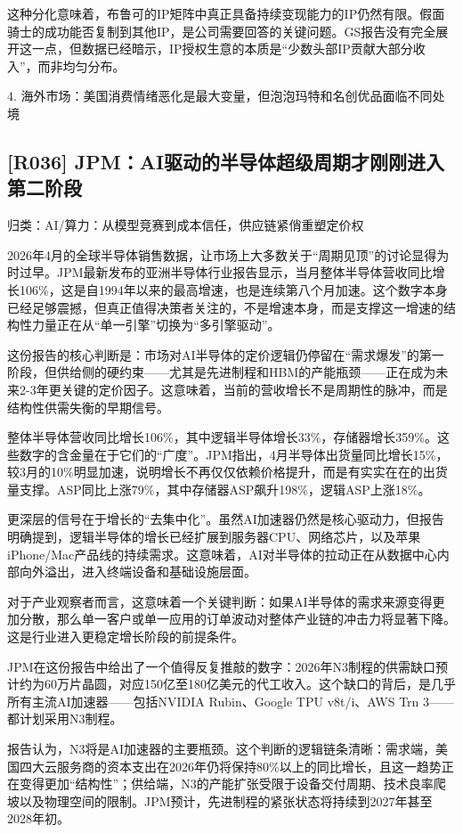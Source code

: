 \documentclass[11pt]{ctexart}
\begin{document}
这种分化意味着，布鲁可的IP矩阵中真正具备持续变现能力的IP仍然有限。假面骑士的成功能否复制到其他IP，是公司需要回答的关键问题。GS报告没有完全展开这一点，但数据已经暗示，IP授权生意的本质是“少数头部IP贡献大部分收入”，而非均匀分布。

4. 海外市场：美国消费情绪恶化是最大变量，但泡泡玛特和名创优品面临不同处境

\subsection{[R036] JPM：AI驱动的半导体超级周期才刚刚进入第二阶段}
{\small\color{refgray}归类：AI/算力：从模型竞赛到成本信任，供应链紧俏重塑定价权}

2026年4月的全球半导体销售数据，让市场上大多数关于“周期见顶”的讨论显得为时过早。JPM最新发布的亚洲半导体行业报告显示，当月整体半导体营收同比增长106\%，这是自1994年以来的最高增速，也是连续第八个月加速。这个数字本身已经足够震撼，但真正值得决策者关注的，不是增速本身，而是支撑这一增速的结构性力量正在从“单一引擎”切换为“多引擎驱动”。

这份报告的核心判断是：市场对AI半导体的定价逻辑仍停留在“需求爆发”的第一阶段，但供给侧的硬约束——尤其是先进制程和HBM的产能瓶颈——正在成为未来2-3年更关键的定价因子。这意味着，当前的营收增长不是周期性的脉冲，而是结构性供需失衡的早期信号。

整体半导体营收同比增长106\%，其中逻辑半导体增长33\%，存储器增长359\%。这些数字的含金量在于它们的“广度”。JPM指出，4月半导体出货量同比增长15\%，较3月的10\%明显加速，说明增长不再仅仅依赖价格提升，而是有实实在在的出货量支撑。ASP同比上涨79\%，其中存储器ASP飙升198\%，逻辑ASP上涨18\%。

更深层的信号在于增长的“去集中化”。虽然AI加速器仍然是核心驱动力，但报告明确提到，逻辑半导体的增长已经扩展到服务器CPU、网络芯片，以及苹果iPhone/Mac产品线的持续需求。这意味着，AI对半导体的拉动正在从数据中心内部向外溢出，进入终端设备和基础设施层面。

对于产业观察者而言，这意味着一个关键判断：如果AI半导体的需求来源变得更加分散，那么单一客户或单一应用的订单波动对整体产业链的冲击力将显著下降。这是行业进入更稳定增长阶段的前提条件。

JPM在这份报告中给出了一个值得反复推敲的数字：2026年N3制程的供需缺口预计约为60万片晶圆，对应150亿至180亿美元的代工收入。这个缺口的背后，是几乎所有主流AI加速器——包括NVIDIA Rubin、Google TPU v8t/i、AWS Trn 3——都计划采用N3制程。

报告认为，N3将是AI加速器的主要瓶颈。这个判断的逻辑链条清晰：需求端，美国四大云服务商的资本支出在2026年仍将保持80\%以上的同比增长，且这一趋势正在变得更加“结构性”；供给端，N3的产能扩张受限于设备交付周期、技术良率爬坡以及物理空间的限制。JPM预计，先进制程的紧张状态将持续到2027年甚至2028年初。
\end{document}
